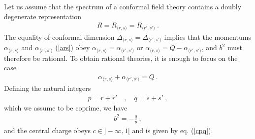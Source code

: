 \documentclass[12pt,a4paper,notitlepage]{report}
\numberwithin{equation}{section}
\theoremstyle{break}
\begin{document}
Let us assume that the spectrum of a conformal field theory contains a doubly degenerate representation 
\begin{align}
 R=R_{\langle r,s \rangle}=R_{\langle r',s' \rangle}\ .
\end{align}
The equality of conformal dimension $\Delta_{\langle r,s \rangle}=\Delta_{\langle r',s' \rangle}$ implies that 
the momentums $\alpha_{\langle r,s \rangle}$ and $\alpha_{\langle r',s' \rangle}$ (\ref{ars}) obey $\alpha_{\langle r,s \rangle}=\alpha_{\langle r',s' \rangle}$ or $\alpha_{\langle r,s \rangle}=Q-\alpha_{\langle r',s' \rangle}$, and $b^2$ must therefore be rational. To obtain rational theories, it is enough to focus on the case 
\begin{align}
 \alpha_{\langle r,s \rangle}+\alpha_{\langle r',s' \rangle} = Q\ .
\end{align}
Defining the natural integers 
\begin{align}
 p = r+r' \quad , \quad q = s+s'\ ,
\end{align}
which we assume to be coprime, we have 
\begin{align} 
 \boxed{b^2 = - \frac{q}{p}} \ ,
\end{align}
and the central charge obeys $c\in ]-\infty, 1[$ and is given by eq. (\ref{cpq}).
\end{document}
